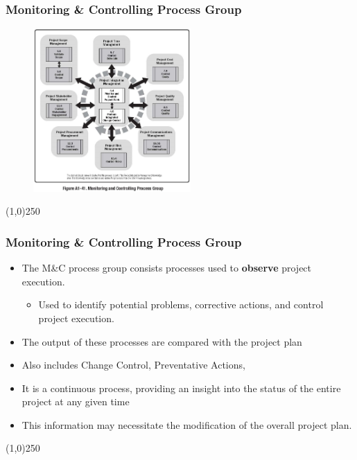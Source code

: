 \begin{frame}
\frametitle{Monitoring \& Controlling Process Group}
 \begin{figure}
 	\centering
 		\includegraphics[width = 6cm]{images/FigA1-41.jpg}
 	\label{fig:A1-41}
 \end{figure}
\end{frame}
\begin{center}\line(1,0){250}\end{center}



\begin{frame}
\frametitle{Monitoring \& Controlling Process Group}
\begin{itemize}
	\item The M\&C process group consists processes used to \textbf{observe} project execution.
\begin{itemize}
	\item Used to identify potential problems, corrective actions, and control project execution.
\end{itemize}
	\item The output of these processes are compared with the project plan
	\item Also includes Change Control, Preventative Actions, 
	\item It is a continuous process, providing an insight into the status of the entire project at any given time
	\item This information may necessitate the modification of the overall project plan.
\end{itemize}
\end{frame}
\begin{center}\line(1,0){250}\end{center}



